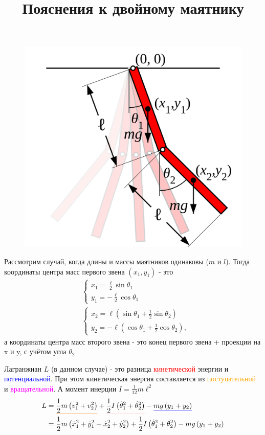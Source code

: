 \documentclass[a4paper,16pt]{article}
\title{\textbf{Пояснения к двойному маятнику}}
\date{}
\def\mathunderline#1#2{\color{#1}\underline{{\color{black}#2}}\color{black}}
\begin{document}
\maketitle

\begin{figure}[h]
    \centering
    \includegraphics[width=0.5\linewidth]{pend.png}
\end{figure}

Рассмотрим случай, когда длины и массы маятников одинаковы ($m \text{ и } l$).
Тогда координаты центра масс первого звена $(x_1,y_1)$ - это
\begin{equation}
\begin{split}
&\begin{cases}
    x_1 = \frac{\ell}{2} \sin \theta_1 \\
    y_1 = -\frac{\ell}{2} \cos \theta_1
    \end{cases}
    \\ 
    &\begin{cases}
        x_2 = \ell \left (  \sin \theta_1 + \frac{1}{2} \sin \theta_2 \right )\\
        y_2 = -\ell \left (  \cos \theta_1 + \frac{1}{2} \cos \theta_2 \right ),
        \end{cases}
\end{split}
    \label{eq:1}
\end{equation}
а координаты центра масс второго звена - это конец первого
звена + проекции на x и y, с учётом угла $\theta_2$

Лагранжиан $L$ (в данном случае) - это разница \textcolor{red}{кинетической} энергии и \textcolor{blue}{потенциальной}.
При этом кинетическая энергия составляется из \textcolor{orange}{поступательной} и \textcolor{magenta}{вращательной}.
А момент инерции $I=\frac{1}{12} m \ell^2$
\begin{align}
    L & = \mathunderline{orange}{\frac{1}{2} m \left ( v_1^2 + v_2^2 \right )} + \mathunderline{pink}{\frac{1}{2} I \left ( {\dot \theta_1}^2 + {\dot \theta_2}^2 \right )} - \mathunderline{blue}{m g \left ( y_1 + y_2 \right )} \notag \\ 
    & = \frac{1}{2} m \left ( {\dot x_1}^2 + {\dot y_1}^2 + {\dot x_2}^2 + {\dot y_2}^2 \right ) + \frac{1}{2} I \left ( {\dot \theta_1}^2 + {\dot \theta_2}^2 \right ) - m g \left ( y_1 + y_2 \right )
\end{align} 
\end{document}

